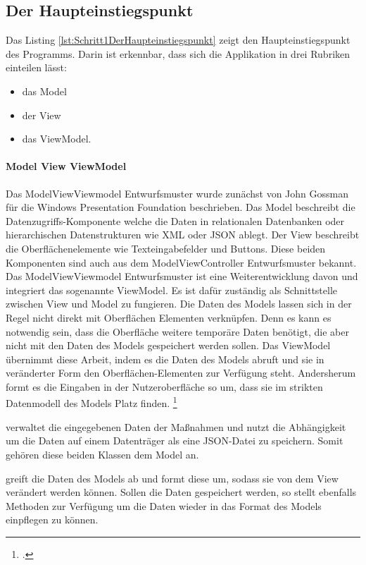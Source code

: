 
\ifincludeall \clearpage \fi
\subsection{Der Haupteinstiegspunkt}

Das Listing \ref{lst:Schritt1DerHaupteinstiegspunkt} zeigt den Haupteinstiegspunkt des Programms.
Darin ist erkennbar, dass sich die Applikation in drei Rubriken einteilen lässt:
\begin{itemize}
  \item das Model 
  \item der View 
  \item das ViewModel. 
\end{itemize}
\paragraph{Model View ViewModel}
Das ModelViewViewmodel Entwurfsmuster wurde zunächst von John Gossman für die Windows Presentation Foundation beschrieben.
Das Model beschreibt die Datenzugriffs-Komponente welche die Daten in relationalen Datenbanken oder hierarchischen Datenstrukturen wie XML oder JSON ablegt.
Der View beschreibt die Oberflächenelemente wie Texteingabefelder und Buttons.
Diese beiden Komponenten sind auch aus dem ModelViewController Entwurfsmuster bekannt.
Das ModelViewViewmodel Entwurfsmuster ist eine Weiterentwicklung davon und integriert das sogenannte ViewModel.
Es ist dafür zuständig als Schnittstelle zwischen View und Model zu fungieren.
Die Daten des Models lassen sich in der Regel nicht direkt mit Oberflächen Elementen verknüpfen.
Denn es kann es notwendig sein, dass die Oberfläche weitere temporäre Daten benötigt, die aber nicht mit den Daten des Models gespeichert werden sollen.
Das ViewModel übernimmt diese Arbeit, indem es die Daten des Models abruft und sie in veränderter Form den Oberflächen-Elementen zur Verfügung steht.
Andersherum formt es die Eingaben in der Nutzeroberfläche so um, dass sie im strikten Datenmodell des Models Platz finden.
\footcite[Vgl.][]{IntroductionToModelViewViewModelPatternForBuildingWPFApps}

  verwaltet die eingegebenen Daten der Maßnahmen und nutzt die Abhängigkeit   um die Daten auf einem Datenträger als eine JSON-Datei zu speichern.
Somit gehören diese beiden Klassen dem Model an.

  greift die Daten des Models ab und formt diese um, sodass sie von dem View   verändert werden können.
Sollen die Daten gespeichert werden, so stellt  ebenfalls Methoden zur Verfügung um die Daten wieder in das Format des Models einpflegen zu können.

